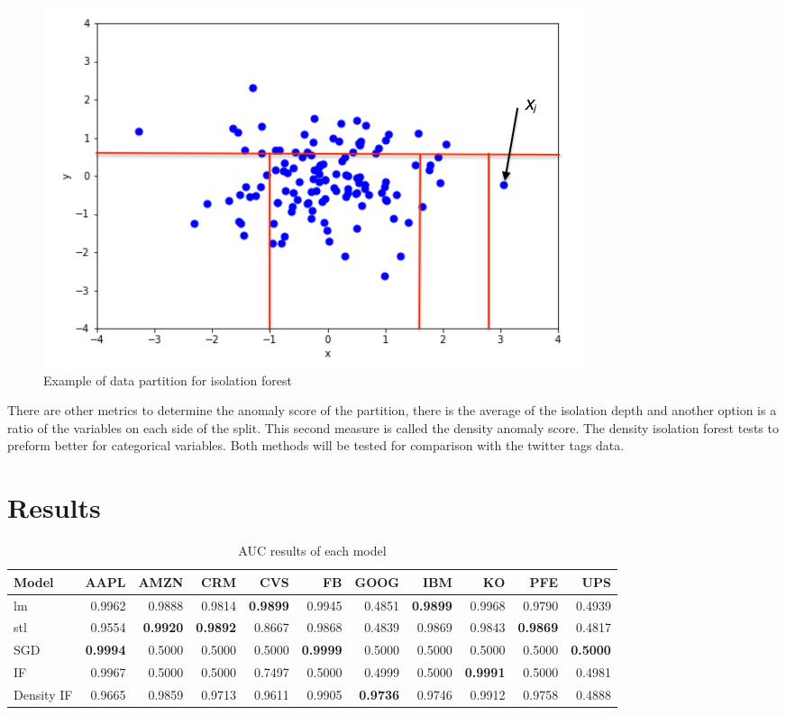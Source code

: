\documentclass{article}
\begin{document}
\begin{figure}[ht]
    \centering
    \includegraphics[width=.6\textwidth]{../Isolating_an_Anomalous_Point.png}
    \caption{Example of data partition for isolation forest}
    \label{fig:iso_fig}
\end{figure}

There are other metrics to determine the anomaly score of the partition, there is the average of the isolation depth and another option is a ratio of the variables on each side of the split. This second measure is called the density anomaly score. The density isolation forest tests to preform better for categorical variables. Both methods will be tested for comparison with the twitter tags data.

\section{Results}


\begin{table}[ht]
    \centering
    \caption{AUC results of each model}
    \label{tab:auc}
    \small
    \begin{tabular}{l|r|r|r|r|r|r|r|r|r|r}
        \hline
        Model & AAPL & AMZN & CRM & CVS & FB & GOOG & IBM & KO & PFE & UPS\\
        \hline
        lm & 0.9962 & 0.9888 & 0.9814 & \textbf{0.9899} & 0.9945 & 0.4851 & \textbf{0.9899} & 0.9968 & 0.9790 & 0.4939\\
        \hline
        stl & 0.9554 & \textbf{0.9920} & \textbf{0.9892} & 0.8667 & 0.9868 & 0.4839 & 0.9869 & 0.9843 & \textbf{0.9869} & 0.4817\\
        \hline
        SGD & \textbf{0.9994} & 0.5000 & 0.5000 & 0.5000 & \textbf{0.9999} & 0.5000 & 0.5000 & 0.5000 & 0.5000 & \textbf{0.5000}\\
        \hline
        IF & 0.9967 & 0.5000 & 0.5000 & 0.7497 & 0.5000 & 0.4999 & 0.5000 & \textbf{0.9991} & 0.5000 & 0.4981\\
        \hline
        Density IF & 0.9665 & 0.9859 & 0.9713 & 0.9611 & 0.9905 & \textbf{0.9736} & 0.9746 & 0.9912 & 0.9758 & 0.4888\\
        \hline
    \end{tabular}
\end{table}
\end{document}
